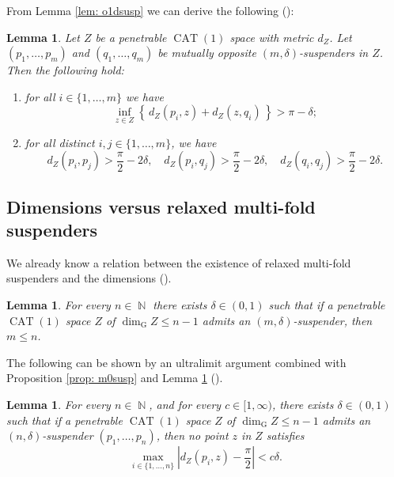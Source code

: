 \documentclass[a4paper,12pt]{amsart}
\newcommand{\CAT}{\operatorname{CAT}}
\newcommand{\N}{\operatorname{\mathbb{N}}}
\numberwithin{equation}{section}
\theoremstyle{plain}
\newtheorem{lem}[thm]{Lemma}
\theoremstyle{definition}
\theoremstyle{remark}
\begin{document}
From Lemma \ref{lem: o1dsusp} we can derive the following
(\cite[Lemma 3.3]{nagano6}):

\begin{lem}\label{lem: omdsusp}
Let $Z$ be a penetrable $\CAT(1)$ space with metric $d_Z$.
Let $(p_1,\dots,p_m)$ and $(q_1,\dots,q_m)$ be mutually opposite 
$(m,\delta)$-suspenders in $Z$.
Then the following hold:
\begin{enumerate}
\item
for all $i \in \{ 1, \dots, m \}$
we have
\begin{equation}
\inf_{z \in Z} \left\{ \, d_Z(p_i,z) + d_Z(z,q_i) \, \right\} > \pi - \delta;
\label{eqn: omdsuspa}
\end{equation}
\item
for all distinct $i, j \in \{ 1, \dots, m \}$, 
we have
\begin{equation}
d_Z(p_i,p_j) > \frac{\pi}{2} - 2\delta,
\quad
d_Z(p_i,q_j) > \frac{\pi}{2} - 2\delta,
\quad
d_Z(q_i,q_j) > \frac{\pi}{2} - 2\delta.
\label{eqn: omdsuspb}
\end{equation}
\end{enumerate}
\end{lem}

\subsection{Dimensions versus relaxed multi-fold suspenders}

We already know a relation between 
the existence of relaxed multi-fold suspenders and the dimensions
(\cite[Lemma 4.9]{nagano6}).

\begin{lem}\label{lem: capmdsusp}
For every $n \in \N$
there exists $\delta \in (0,1)$
such that
if a penetrable $\CAT(1)$ space $Z$ 
of $\dim_{\mathrm{G}} Z \le n-1$
admits an $(m,\delta)$-suspender,
then $m \le n$. 
\end{lem}

The following can be shown by an ultralimit argument
combined with Proposition \ref{prop: m0susp}
and Lemma \ref{lem: omdsusp}
(\cite[Lemma 4.10]{nagano6}).

\begin{lem}\label{lem: fullsusp}
For every $n \in \N$, and for every $c \in [1,\infty)$,
there exists $\delta \in (0,1)$
such that
if a penetrable $\CAT(1)$ space $Z$ 
of $\dim_{\mathrm{G}} Z \le n-1$
admits an $(n,\delta)$-suspender $(p_1,\dots,p_n)$,
then no point $z$ in $Z$
satisfies 
\[
\max_{i \in \{ 1, \dots, n \}} 
\left\vert d_Z \left( p_i, z \right) - \frac{\pi}{2} \right\vert < c\delta.
\]
\end{lem}
\end{document}
